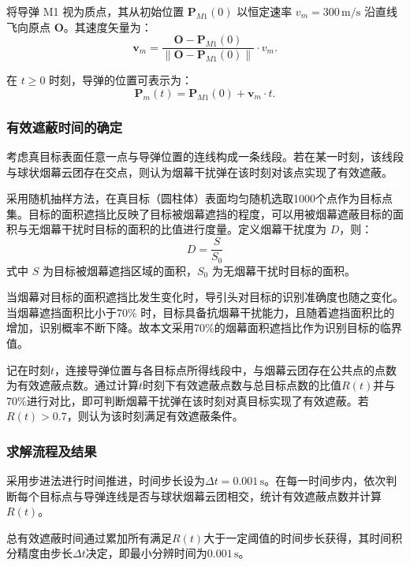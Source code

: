 \documentclass[12pt]{article}
\begin{document}
\begin{CJK}{UTF8}{gbsn}
		将导弹 M1 视为质点，其从初始位置 $\mathbf{P}_{M1}(0)$ 以恒定速率 $v_m = 300 \, \mathrm{m/s}$ 沿直线飞向原点 $\mathbf{O}$。其速度矢量为：
		\begin{equation}
			\mathbf{v}_m = \frac{\mathbf{O} - \mathbf{P}_{M1}(0)}{\| \mathbf{O} - \mathbf{P}_{M1}(0) \|} \cdot v_m.
		\end{equation}
		
		在 $t \geq 0$ 时刻，导弹的位置可表示为：
		\begin{equation}
			\mathbf{P}_m(t) = \mathbf{P}_{M1}(0) + \mathbf{v}_m \cdot t.
		\end{equation}
		
		\subsubsection{有效遮蔽时间的确定}
		
		考虑真目标表面任意一点与导弹位置的连线构成一条线段。若在某一时刻，该线段与球状烟幕云团存在交点，则认为烟幕干扰弹在该时刻对该点实现了有效遮蔽。
		
		采用随机抽样方法，在真目标（圆柱体）表面均匀随机选取1000个点作为目标点集。目标的面积遮挡比反映了目标被烟幕遮挡的程度，可以用被烟幕遮蔽目标的面积与无烟幕干扰时目标的面积的比值进行度量。定义烟幕干扰度为 $D$，则：
		\begin{equation}
			D = \frac{S}{S_0}
		\end{equation}
		式中 $S$ 为目标被烟幕遮挡区域的面积，$S_0$ 为无烟幕干扰时目标的面积。
		
		当烟幕对目标的面积遮挡比发生变化时，导引头对目标的识别准确度也随之变化。当烟幕遮挡面积比小于70\% 时，目标具备抗烟幕干扰能力，且随着遮挡面积比的增加，识别概率不断下降\cite{1}。故本文采用70\%的烟幕面积遮挡比作为识别目标的临界值。
		
		记在时刻$t$，连接导弹位置与各目标点所得线段中，与烟幕云团存在公共点的点数为有效遮蔽点数。通过计算$t$时刻下有效遮蔽点数与总目标点数的比值$R(t)$并与70\%进行对比，即可判断烟幕干扰弹在该时刻对真目标实现了有效遮蔽。若$R(t)>0.7$，则认为该时刻满足有效遮蔽条件。
		
		\subsubsection{求解流程及结果}
		
		采用步进法进行时间推进，时间步长设为$\Delta t = 0.001\,\mathrm{s}$。在每一时间步内，依次判断每个目标点与导弹连线是否与球状烟幕云团相交，统计有效遮蔽点数并计算$R(t)$。
		
		总有效遮蔽时间通过累加所有满足$R(t)$大于一定阈值的时间步长获得，其时间积分精度由步长$\Delta t$决定，即最小分辨时间为$0.001\,\mathrm{s}$。
		

\end{CJK}
\end{document}
